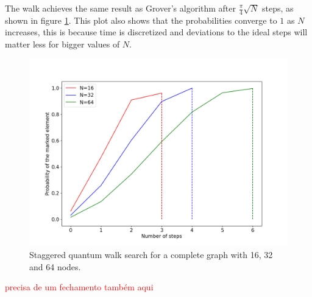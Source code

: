                 The walk achieves the same result as Grover's algorithm after $\frac{\pi}{4}\sqrt{N}$ steps, as shown in figure \ref{fig:StagSearch}. This plot also shows that the probabilities converge to $1$ as $N$ increases, this is because time is discretized and deviations to the ideal steps will matter less for bigger values of $N$.
            	\begin{figure}[!h]
                    \centering
                    \includegraphics[scale=0.40]{img/StagQuantumWalk/Search/163264.png}
                     \caption{Staggered quantum walk search for a complete graph with 16, 32 and 64 nodes.}\label{fig:StagSearch}
                \end{figure}
                
               
               \textcolor{red}{precisa de um fechamento também aqui}
                
